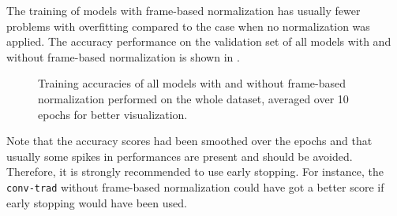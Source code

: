 \FloatBarrier
\noindent
The training of models with frame-based normalization has usually fewer problems with overfitting compared to the case when no normalization was applied.
The accuracy performance on the validation set of all models with and without frame-based normalization is shown in .
\begin{figure}[!ht]
  \centering
  \quad
  \caption{Training accuracies of all models with and without frame-based normalization performed on the whole dataset, averaged over 10 epochs for better visualization.}
  \label{fig:exp_final_acc}
\end{figure}
\FloatBarrier
\noindent
Note that the accuracy scores had been smoothed over the epochs and that usually some spikes in performances are present and should be avoided.
Therefore, it is strongly recommended to use early stopping.
For instance, the \texttt{conv-trad} without frame-based normalization could have got a better score if early stopping would have been used.

